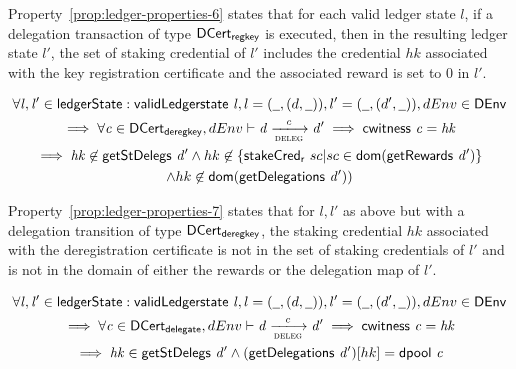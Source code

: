 Property~\ref{prop:ledger-properties-6} states that for each valid ledger state
$l$, if a delegation transaction of type $\mathsf{DCert_{regkey}}$ is executed, then in the
resulting ledger state $l'$, the set of staking credential of $l'$ includes the
credential $hk$ associated with the key registration certificate and the
associated reward is set to 0 in $l'$.

\begin{property}
  \begin{multline*}
    \forall \var{l}, \var{l'} \in \ledgerState: \applyFun{validLedgerstate}{l},
    l = (\wcard, (d, \wcard)), l' = (\wcard, (d', \wcard)), dEnv\in\DEnv \\
    \implies \forall \var{c} \in \DCertDeRegKey, dEnv\vdash\var{d}
    \trans{deleg}{c} \var{d'} \implies \applyFun{cwitness}{c} = \var{hk}\\
    \implies \var{hk} \not\in \applyFun{getStDelegs}{d'} \wedge hk\not\in
    \left\{ \fun{stakeCred_{r}}~sc\vert
      sc\in\fun{dom}(\applyFun{getRewards}{d'})
    \right\}\\
    \wedge hk \not\in \fun{dom}(\applyFun{getDelegations}{d'}))
  \end{multline*}
  \label{prop:ledger-properties-7}
\end{property}

Property~\ref{prop:ledger-properties-7} states that for $l, l'$ as above but
with a delegation transition of type $\mathsf{DCert_{deregkey}}$, the staking credential
$hk$ associated with the deregistration certificate is not in the set of staking
credentials of $l'$ and is not in the domain of either the rewards or the
delegation map of $l'$.

\begin{property}
  \begin{multline*}
    \forall \var{l}, \var{l'} \in \ledgerState: \applyFun{validLedgerstate}{l},
    l = (\wcard, (d,\wcard)), l' = (\wcard, (d',\wcard)), dEnv\in\DEnv \\
    \implies \forall \var{c} \in \DCertDeleg, dEnv \vdash\var{d}
    \trans{deleg}{c} \var{d'} \implies \applyFun{cwitness}{c} = \var{hk}\\
    \implies \var{hk} \in \applyFun{getStDelegs}{d'} \wedge
    (\applyFun{getDelegations}{d'})[hk] = \applyFun{dpool}{c}
  \end{multline*}
  \label{prop:ledger-properties-8}
\end{property}


